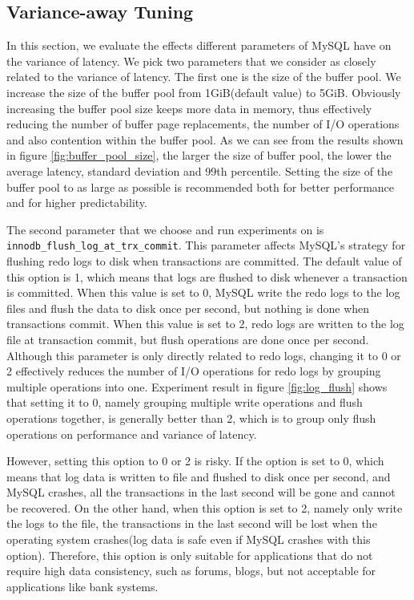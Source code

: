 \subsection{Variance-away Tuning}
In this section, we evaluate the effects different parameters of MySQL have
on the variance of latency. We pick two parameters that we consider as
closely related to the variance of latency. The first one is the size of the
buffer pool. We increase the size of the buffer pool from 1GiB(default value)
to 5GiB. Obviously increasing the buffer pool size keeps more data in memory,
thus effectively reducing the number of buffer page replacements, the number of
I/O operations and also contention within the buffer pool. As we can see from
the results shown in figure \ref{fig:buffer_pool_size}, the larger the size of
buffer pool, the lower the average latency, standard deviation and 99th
percentile. Setting the size of the buffer pool to as large as possible is
recommended both for better performance and for higher predictability.

The second parameter that we choose and run experiments on is
\texttt{innodb\_flush\_log\_at\_trx\_commit}. This parameter affects MySQL's
strategy for flushing redo logs to disk when transactions are committed. The
default value of this option is 1, which means that logs are flushed to disk
whenever a transaction is committed. When this value is set to 0, MySQL write
the redo logs to the log files and flush the data to disk once per second, but
nothing is done when transactions commit. When this value is set to 2, redo
logs are written to the log file at transaction commit, but flush operations
are done once per second. Although this parameter is only directly related to
redo logs, changing it to 0 or 2 effectively reduces the number of I/O
operations for redo logs by grouping multiple operations into one. Experiment
result in figure \ref{fig:log_flush} shows that setting it to 0, namely
grouping multiple write operations and flush operations together, is generally
better than 2, which is to group only flush operations on performance and
variance of latency.

However, setting this option to 0 or 2 is risky. If the option is set to 0,
which means that log data is written to file and flushed to disk once per
second, and MySQL crashes, all the transactions in the last second will be gone
and cannot be recovered. On the other hand, when this option is set to 2,
namely only write the logs to the file, the transactions in the last second
will be lost when the operating system crashes(log data is safe even if MySQL
crashes with this option). Therefore, this option is only suitable for
applications that do not require high data consistency, such as forums, blogs,
but not acceptable for applications like bank systems.

